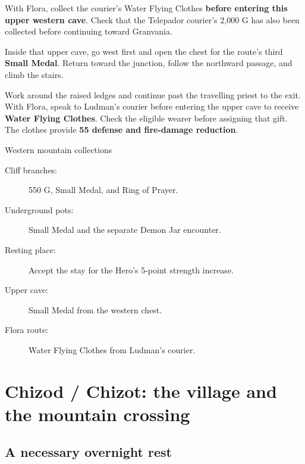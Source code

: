 With Flora, collect the courier's Water Flying Clothes \textbf{before
entering this upper western cave}. Check that the Telepador courier's
2,000 G has also been collected before continuing toward Granvania.

Inside that upper cave, go west first and open the chest for the
route's third \textbf{Small Medal}. Return toward the junction,
follow the northward passage, and climb the stairs.

Work around the raised ledges and continue past the travelling priest
to the exit. With Flora, speak to Ludman's courier before entering
the upper cave to receive \textbf{Water Flying Clothes}. Check the
eligible wearer before assigning that gift. The clothes provide
\textbf{55 defense and fire-damage reduction}.


\begin{routecheck}{Western mountain collections}
\begin{description}
  \item[Cliff branches:] 550 G, Small Medal, and Ring of Prayer.
  \item[Underground pots:] Small Medal and the separate Demon Jar encounter.
  \item[Resting place:] Accept the stay for the Hero's 5-point
    strength increase.
  \item[Upper cave:] Small Medal from the western chest.
  \item[Flora route:] Water Flying Clothes from Ludman's courier.
\end{description}
\end{routecheck}

\section{Chizod / Chizot: the village and the mountain crossing}

\subsection*{A necessary overnight rest}

